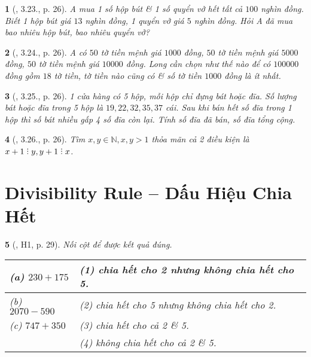 \documentclass{article}
\newtheorem{baitoan}{}
\DeclareRobustCommand{\divby}{%
	\mathrel{\vbox{\baselineskip.65ex\lineskiplimit0pt\hbox{.}\hbox{.}\hbox{.}}}%
}
\begin{document}
\begin{baitoan}[\cite{TLCT_THCS_Toan_6_so_hoc}, 3.23., p. 26]
	A mua 1 số hộp bút \& 1 số quyển vở hết tất cả $100$ nghìn đồng. Biết 1 hộp bút giá $13$ nghìn đồng, 1 quyển vở giá $5$ nghìn đồng. Hỏi A đã mua bao nhiêu hộp bút, bao nhiêu quyển vở?
\end{baitoan}

\begin{baitoan}[\cite{TLCT_THCS_Toan_6_so_hoc}, 3.24., p. 26]
	A có $50$ tờ tiền mệnh giá $1000$ đồng, $50$ tờ tiền mệnh giá $5000$ đồng, $50$ tờ tiền mệnh giá $10000$ đồng. Long cần chọn như thế nào để có $100000$ đồng gồm $18$ tờ tiền, tờ tiền nào cũng có \& số tờ tiền $1000$ đồng là ít nhất.
\end{baitoan}

\begin{baitoan}[\cite{TLCT_THCS_Toan_6_so_hoc}, 3.25., p. 26]
	1 cửa hàng có 5 hộp, mỗi hộp chỉ đựng bát hoặc đĩa. Số lượng bát hoặc đĩa trong 5 hộp là $19,22,32,35,37$ cái. Sau khi bán hết số đĩa trong 1 hộp thì số bát nhiều gấp 4 số đĩa còn lại. Tính số đĩa đã bán, số đĩa tổng cộng.
\end{baitoan}

\begin{baitoan}[\cite{TLCT_THCS_Toan_6_so_hoc}, 3.26., p. 26]
	Tìm $x,y\in\mathbb{N},x,y > 1$ thỏa mãn cả 2 điều kiện là $x + 1\divby y,y + 1\divby x$.
\end{baitoan}


\section{Divisibility Rule -- Dấu Hiệu Chia Hết}

\begin{baitoan}[\cite{Binh_boi_duong_Toan_6_tap_1}, H1, p. 29]
	Nối cột để được kết quả đúng.
	\begin{table}[H]
		\centering
		\begin{tabular}{|l|l|}
			\hline
			(a) $230 + 175$ & (1) chia hết cho 2 nhưng không chia hết cho 5. \\
			\hline
			(b) $2070 - 590$ & (2) chia hết cho 5 nhưng không chia hết cho 2. \\
			\hline
			(c) $747 + 350$ & (3) chia hết cho cả 2 \& 5. \\
			\hline
			& (4) không chia hết cho cả 2 \& 5. \\
			\hline
		\end{tabular}
	\end{table}
\end{baitoan}
\end{document}

